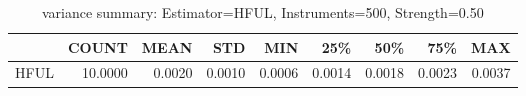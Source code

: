 \begin{table}[ht]
\centering
\caption{variance summary: Estimator=HFUL, Instruments=500, Strength=0.50}
\begin{tabular}{lrrrrrrrr}
\toprule
 & COUNT & MEAN & STD & MIN & 25\% & 50\% & 75\% & MAX \\
\midrule
HFUL & 10.0000 & 0.0020 & 0.0010 & 0.0006 & 0.0014 & 0.0018 & 0.0023 & 0.0037 \\
\bottomrule
\end{tabular}
\end{table}
